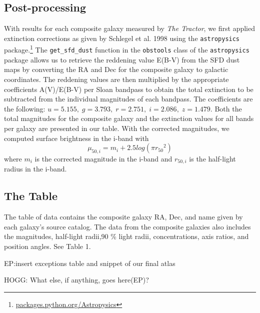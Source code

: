 \documentclass[12pt,preprint,pdftex]{aastex}
\begin{document}
\subsection{Post-processing}
With results for each composite galaxy measured by \emph{The Tractor}, we
first applied extinction corrections as given by Schlegel et al. 1998
using the \verb|astropysics|
package.\footnote{\url{packages.python.org/Astropysics}} The
\verb|get_sfd_dust| function in the \verb|obstools| class of the
\verb|astropysics| package allows us to retrieve the reddening value
E(B-V) from the SFD dust maps by converting the RA and Dec for the
composite galaxy to galactic coordinates. The reddening values are
then multiplied by the appropriate coefficients A(V)/E(B-V) per Sloan
bandpass to obtain the total extinction to be subtracted from the
individual magnitudes of each bandpass. The coefficients are the
following: $u=5.155,\;g=3.793,\; r=2.751,\; i=2.086,\; z=1.479$. Both
the total magnitudes for the composite galaxy and the extinction
values for all bands per galaxy are presented in our table. With the
corrected magnitudes, we computed surface brightness in the i-band
with \begin{equation}
  \mu_{50,i}=m_i+2.5log(\pi{r_{50}}^2) \end{equation} where $m_i$ is
the corrected magnitude in the i-band and $r_{50,i}$ is the half-light
radius in the i-band.

\subsection{The Table}
The table of data contains the composite galaxy RA, Dec, and name
given by each galaxy's source catalog. The
data from the composite galaxies also includes the magnitudes,
half-light radii,90 \% light radii, concentrations, axis ratios, and
position angles. See Table 1. 

EP:insert exceptions table and snippet of our final atlas

HOGG: What else, if anything, goes here(EP)?
\end{document}

